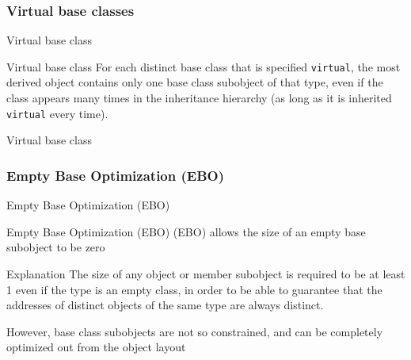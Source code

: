\subsubsection{Virtual base classes}

\begin{frame}{Virtual base class}{}
  \begin{block}{Virtual base class}
    For each distinct base class that is specified \lstinline!virtual!, the most derived object contains only one base class subobject of that type, even if the class appears many times in the inheritance hierarchy (as long as it is inherited \lstinline!virtual! every time).
  \end{block}

  \begin{example}
    \begin{center}
    \end{center}
  \end{example}
\end{frame}

\begin{frame}{Virtual base class}{}
  \begin{example}
  \end{example}
\end{frame}



\subsubsection{Empty Base Optimization (EBO)}

\begin{frame}{Empty Base Optimization (EBO)}{}
  \begin{block}{Empty Base Optimization (EBO)}
     (EBO) allows the size of an empty base subobject to be zero
  \end{block}

  \begin{block}{Explanation}
    The size of any object or member subobject is required to be at least 1 even if the type is an empty class, in order to be able to guarantee that the addresses of distinct objects of the same type are always distinct.

    However, base class subobjects are not so constrained, and can be completely optimized out from the object layout
  \end{block}
\end{frame}

